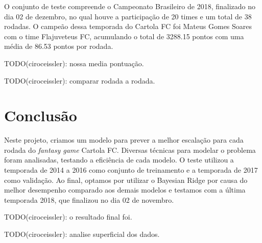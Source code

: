 \documentclass[conference]{IEEEtran}
\newcommand{\tit}[1]{{\textit{#1}}}
\begin{document}
O  conjunto  de teste  compreende  o  Campeonato Brasileiro  de  2018,
finalizado no dia 02 de dezembro, no qual houve a participação de 20
times e um total de 38  rodadas. O campeão dessa temporada do Cartola
FC foi  Mateus Gomes Soares  com o  time Flajuveteus FC,  acumulando o
total de 3288.15 pontos com uma média de 86.53 pontos por rodada.

TODO(ciroceissler): nossa media pontuação.

TODO(ciroceissler): comparar rodada a rodada.

\section{Conclusão}

Neste projeto, criamos um modelo para prever a melhor escalação para
cada rodada do \tit{fantasy game}  Cartola FC. Diversas técnicas para
modelar o  problema foram analisadas,  testando a eficiência  de cada
modelo. O teste  utilizou a temporada de 2014 a  2016 como conjunto de
treinamento e a temporada de  2017 como validação. Ao final, optamos
por utilizar o Bayesian Ridge por causa do melhor desempenho comparado
aos  demais modelos  e  testamos  com a  última  temporada 2018,  que
finalizou no dia 02 de novembro.

TODO(ciroceissler): o resultado final foi.

TODO(ciroceissler): analise superficial dos dados.
\end{document}
